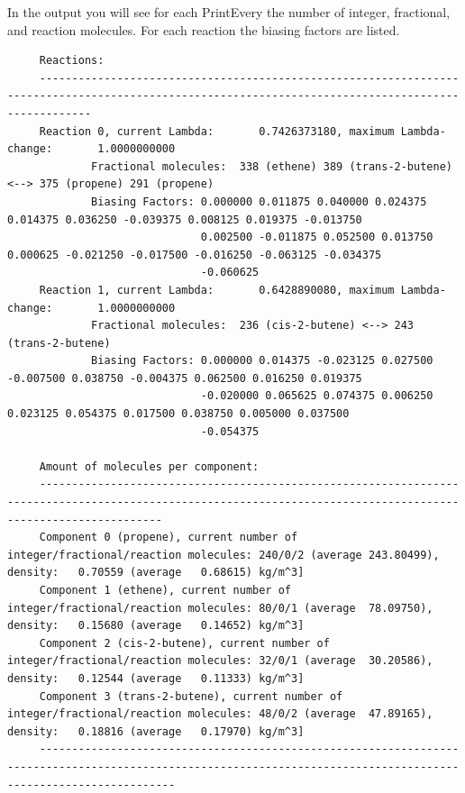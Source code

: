 In the output you will see for each PrintEvery the number of integer, fractional, and reaction molecules.
For each reaction the biasing factors are listed.
\begin{tiny}
\begin{verbatim}
     Reactions:
     ----------------------------------------------------------------------------------------------------------------------------------------------------
     Reaction 0, current Lambda:       0.7426373180, maximum Lambda-change:       1.0000000000
             Fractional molecules:  338 (ethene) 389 (trans-2-butene) <--> 375 (propene) 291 (propene)
             Biasing Factors: 0.000000 0.011875 0.040000 0.024375 0.014375 0.036250 -0.039375 0.008125 0.019375 -0.013750
                              0.002500 -0.011875 0.052500 0.013750 0.000625 -0.021250 -0.017500 -0.016250 -0.063125 -0.034375
                              -0.060625
     Reaction 1, current Lambda:       0.6428890080, maximum Lambda-change:       1.0000000000
             Fractional molecules:  236 (cis-2-butene) <--> 243 (trans-2-butene)
             Biasing Factors: 0.000000 0.014375 -0.023125 0.027500 -0.007500 0.038750 -0.004375 0.062500 0.016250 0.019375
                              -0.020000 0.065625 0.074375 0.006250 0.023125 0.054375 0.017500 0.038750 0.005000 0.037500
                              -0.054375
     
     Amount of molecules per component:
     ---------------------------------------------------------------------------------------------------------------------------------------------------------------
     Component 0 (propene), current number of integer/fractional/reaction molecules: 240/0/2 (average 243.80499), density:   0.70559 (average   0.68615) kg/m^3]
     Component 1 (ethene), current number of integer/fractional/reaction molecules: 80/0/1 (average  78.09750), density:   0.15680 (average   0.14652) kg/m^3]
     Component 2 (cis-2-butene), current number of integer/fractional/reaction molecules: 32/0/1 (average  30.20586), density:   0.12544 (average   0.11333) kg/m^3]
     Component 3 (trans-2-butene), current number of integer/fractional/reaction molecules: 48/0/2 (average  47.89165), density:   0.18816 (average   0.17970) kg/m^3]
     -----------------------------------------------------------------------------------------------------------------------------------------------------------------
\end{verbatim}
\end{tiny}

